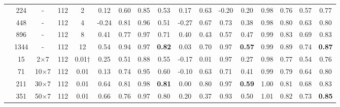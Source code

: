 \begin{table}[!ht]
{\begin{tabular}{c|cccc|cccc|cccc|cccc}
\midrule
{}
& 224 & - & 112 & 2  & 0.12 & 0.60 & 0.85 & 0.53 & 0.17 & 0.63 & -0.20 & 0.20 & 0.98 & 0.76 & 0.57 & 0.77 \\
& 448 & - & 112 & 4  & -0.24 & 0.81 & 0.96 & 0.51 & -0.27 & 0.67 & 0.73 & 0.38 & 0.98 & 0.80 & 0.63 & 0.80 \\
& 896 & - & 112 & 8 & 0.41 & 0.77 & 0.97 & 0.71 & 0.40 & 0.43 & 0.57 & 0.47 & 0.99 & 0.83 & 0.69 & 0.83 \\
& 1344 & - & 112 & 12 & 0.54 & 0.94 & 0.97 & \textbf{0.82} & 0.03 & 0.70 & 0.97 & \textbf{0.57} & 0.99 & 0.89 & 0.74 & \textbf{0.87} \\
\midrule
{} 
& 15  & 2$\times$7 & 112 & 0.01$\dagger$   & 0.25 & 0.51 & 0.88 & 0.55 & -0.17 & 0.01 & 0.97 & 0.27 & 0.98 & 0.77 & 0.54 & 0.76 \\
& 71  & 10$\times$7 & 112 & 0.01  & 0.13 & 0.74 & 0.95 & 0.60 & -0.10 & 0.63 & 0.71 & 0.41 & 0.99 & 0.79 & 0.64 & 0.80 \\
& 211  & 30$\times$7 & 112 & 0.01 & 0.64 & 0.81 & 0.98 & \textbf{0.81} & 0.00 & 0.80 & 0.97 & \textbf{0.59} & 1.00 & 0.81 & 0.68 & 0.83 \\
& 351  & 50$\times$7 & 112 & 0.01 & 0.66 & 0.76 & 0.97 & 0.80 & 0.20 & 0.37 & 0.93 & 0.50 & 1.01 & 0.82 & 0.73 & \textbf{0.85} \\
\bottomrule
\end{tabular}}
\end{table}